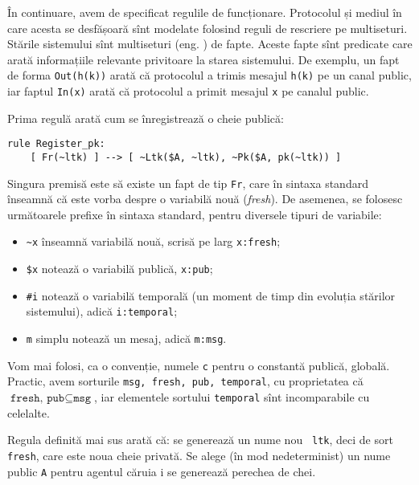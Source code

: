 În continuare, avem de specificat regulile de funcționare. Protocolul și mediul
în care acesta se desfășoară sînt modelate folosind reguli de rescriere pe
multiseturi. Stările sistemului sînt multiseturi (eng. ) de
fapte. Aceste fapte sînt predicate care arată informațiile relevante privitoare
la starea sistemului. De exemplu, un fapt de forma \texttt{Out(h(k))} arată
că protocolul a trimis mesajul \texttt{h(k)} pe un canal public, iar faptul
\texttt{In(x)} arată că protocolul a primit mesajul \texttt{x} pe canalul
public.\footnotemark


Prima regulă arată cum se înregistrează o cheie publică:

\begin{verbatim}
rule Register_pk:
    [ Fr(~ltk) ] --> [ ~Ltk($A, ~ltk), ~Pk($A, pk(~ltk)) ]
\end{verbatim}    

Singura premisă este să existe un fapt de tip \texttt{Fr}, care în sintaxa
standard înseamnă că este vorba despre o variabilă nouă (\emph{fresh}).
De asemenea, se folosesc următoarele prefixe în sintaxa standard, pentru
diversele tipuri de variabile:
\begin{itemize}
\item \texttt{\~{}x} înseamnă variabilă nouă, scrisă pe larg \texttt{x:fresh};
\item \texttt{\$x} notează o variabilă publică, \texttt{x:pub};
\item \texttt{\#i} notează o variabilă temporală (un moment de timp din evoluția
  stărilor sistemului), adică \texttt{i:temporal};
\item \texttt{m} simplu notează un mesaj, adică \texttt{m:msg}.
\end{itemize}

Vom mai folosi, ca o convenție, numele \texttt{c} pentru o constantă publică,
globală. Practic, avem sorturile \texttt{msg, fresh, pub, temporal},
cu proprietatea că $ \texttt{fresh, pub} \subseteq \texttt{msg} $, iar elementele
sortului \texttt{temporal} sînt incomparabile cu celelalte.

Regula definită mai sus arată că: se generează un nume nou \texttt{~ltk}, deci
de sort \texttt{fresh}, care este noua cheie privată. Se alege (în mod nedeterminist)
un nume public \texttt{A} pentru agentul căruia i se generează perechea de chei.

